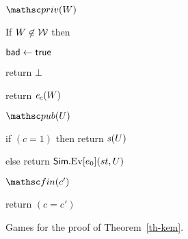 \begin{figure}[tp]
{		\ExptSepSpace
		
			\begin{oracle}{$\priv(W)$}
			\item If $W \not\in{\cal W}$ then
			\item \hindent $\mathsf{bad}\gets\mathsf{true}$ 
			\item \hindent return $\bot$  
			\item return $\mathit{e}_c(W)$
		\end{oracle}
		\ExptSepSpace
		
		\begin{oracle}{$\pub(U)$}
			\item if $(c=1)$ then return $\mathit{s}(U)$
			\item else return $\mathsf{Sim}.{\mathrm{Ev}}[e_0](st, U)$
		\end{oracle}
		
		\ExptSepSpace
		
		\begin{oracle}{$\Finalize(c')$}
			\item return $(c = c')$
		\end{oracle}
	
		


}
\caption{Games for the proof of Theorem~\ref{th-kem}.}
\label{fig-kem-games}
\hrulefill
\end{figure}


